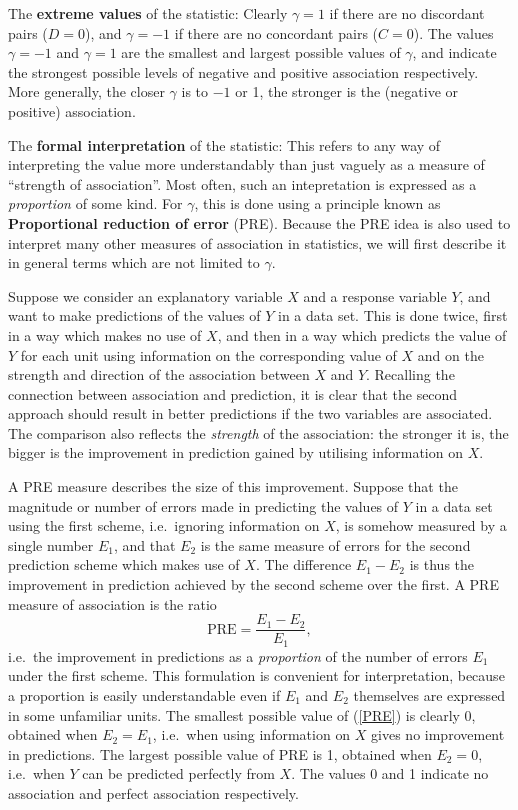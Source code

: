 The \textbf{extreme values} of the statistic: Clearly
$\gamma=1$ if there are no discordant pairs ($D=0$), and $\gamma=-1$ if
there are no concordant pairs ($C=0$). The values $\gamma=-1$ and
$\gamma=1$ are the smallest and largest possible values of $\gamma$, and
indicate the strongest possible levels of negative and positive
association respectively. More generally, the closer $\gamma$ is to $-1$
or 1, the stronger is the (negative or positive) association.

The \textbf{formal interpretation} of the statistic: This refers to any
way of interpreting the value more understandably than just vaguely as a
measure of ``strength of association''. Most often, such an
intepretation is expressed as a \emph{proportion} of some kind. For
$\gamma$, this is done using a principle known as \textbf{Proportional
reduction of error} (PRE). Because the PRE idea is also used to
interpret many other measures of association in statistics, we will
first describe it in general terms which are not limited to $\gamma$.

Suppose we consider an explanatory variable $X$ and a response variable
$Y$, and want to make predictions of the values of $Y$ in a data set.
This is done twice, first in a way which makes no use of $X$, and then
in a way which predicts the value of $Y$ for each unit using information
on the corresponding value of $X$ and on the strength and direction of
the association between $X$ and $Y$. Recalling the connection between
association and prediction, it is clear that the second approach should
result in better predictions if the two variables are associated.  The
comparison also reflects the \emph{strength} of the association: the
stronger it is, the bigger is the improvement in prediction gained by
utilising information on $X$.

A PRE measure describes the size of this improvement.
Suppose that the magnitude or number of errors made in predicting the
values of $Y$ in a data set using the first scheme, i.e.\ ignoring
information on $X$, is somehow measured by a single number $E_{1}$, and
that $E_{2}$ is the same measure of errors for the second
prediction scheme which makes use of $X$. The difference $E_{1}-E_{2}$
is thus the improvement in prediction achieved by the second scheme over
the first. A PRE measure of association is the ratio
\begin{equation}
\text{PRE}= \frac{E_{1}-E_{2}}{E_{1}},
\label{PRE}
\end{equation}
i.e.\ the improvement in predictions as a \emph{proportion} of the
number of errors $E_{1}$ under the first scheme. This formulation is
convenient for interpretation, because a proportion is easily
understandable even if $E_{1}$ and $E_{2}$ themselves are
expressed in some unfamiliar units. The smallest
possible value of (\ref{PRE}) is clearly 0, obtained when $E_{2}=E_{1}$,
i.e.\ when using information on $X$ gives no improvement in predictions.
The largest possible value of PRE is 1, obtained when $E_{2}=0$, i.e.\
when $Y$ can be predicted perfectly from $X$. The values 0 and 1
indicate no association and perfect association respectively.

